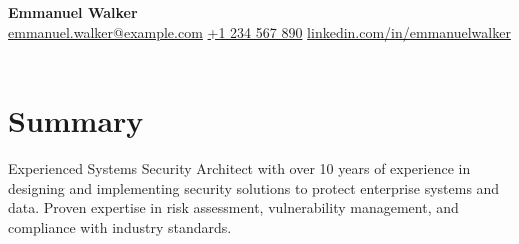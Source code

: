 \documentclass[letter,10pt]{article}
\begin{document}
\begin{center}
    {\LARGE \textbf{Emmanuel Walker}} \\
    \vspace{2mm}
    \href{mailto:emmanuel.walker@example.com}{emmanuel.walker@example.com} \hfill
    \href{tel:+1234567890}{+1 234 567 890} \hfill
    \href{https://www.linkedin.com/in/emmanuelwalker}{linkedin.com/in/emmanuelwalker} \\
    \vspace{4mm}
       {}\\
   
\end{center}

\section*{Summary}
Experienced Systems Security Architect with over 10 years of experience in designing and implementing security solutions to protect enterprise systems and data. Proven expertise in risk assessment, vulnerability management, and compliance with industry standards.
\end{document}
